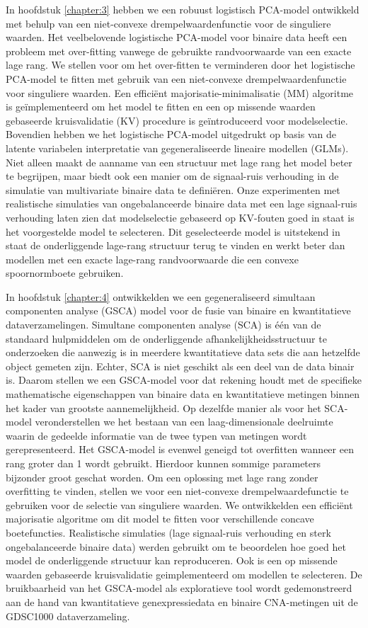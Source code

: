 In hoofdstuk \ref{chapter:3} hebben we een robuust logistisch PCA-model ontwikkeld met behulp van een niet-convexe drempelwaardenfunctie voor de singuliere waarden. Het veelbelovende logistische PCA-model voor binaire data heeft een probleem met over-fitting vanwege de gebruikte randvoorwaarde van een  exacte lage rang. We stellen voor om het over-fitten te verminderen door het logistische PCA-model te fitten met gebruik van een niet-convexe drempelwaardenfunctie voor singuliere waarden. Een efficiënt majorisatie-minimalisatie (MM) algoritme is geïmplementeerd om het model te fitten en een op missende waarden gebaseerde kruisvalidatie (KV) procedure is geïntroduceerd voor modelselectie. Bovendien hebben we het logistische PCA-model uitgedrukt op basis van de latente variabelen interpretatie van gegeneraliseerde lineaire modellen (GLMs). Niet alleen maakt de aanname van een structuur met lage rang het model beter te begrijpen, maar biedt ook een manier om de signaal-ruis verhouding in de simulatie van multivariate binaire data te definiëren. Onze experimenten met realistische simulaties van ongebalanceerde binaire data met een lage signaal-ruis verhouding laten zien dat modelselectie gebaseerd op KV-fouten goed in staat is het voorgestelde model te selecteren. Dit geselecteerde model is uitstekend in staat de onderliggende lage-rang structuur terug te vinden en werkt beter dan modellen met een exacte lage-rang randvoorwaarde die een convexe spoornormboete gebruiken.

In hoofdstuk \ref{chapter:4} ontwikkelden we een gegeneraliseerd simultaan componenten analyse (GSCA) model voor de fusie van binaire en kwantitatieve dataverzamelingen. Simultane componenten analyse (SCA) is \'e\'en van de standaard hulpmiddelen om de onderliggende afhankelijkheidsstructuur te onderzoeken die aanwezig is in meerdere kwantitatieve data sets die aan hetzelfde object gemeten zijn. Echter, SCA is niet geschikt als een deel van de data binair is. Daarom stellen we een GSCA-model voor dat rekening houdt met de specifieke mathematische eigenschappen van binaire data en kwantitatieve metingen binnen het kader van grootste aannemelijkheid. Op dezelfde manier als voor het SCA-model veronderstellen we het bestaan van een laag-dimensionale deelruimte waarin de gedeelde informatie van de twee typen van metingen wordt gerepresenteerd. Het GSCA-model is evenwel geneigd tot overfitten wanneer een rang groter dan 1 wordt gebruikt. Hierdoor kunnen sommige parameters bijzonder groot geschat worden. Om een oplossing met lage rang zonder overfitting te vinden, stellen we voor een niet-convexe drempelwaardefunctie te gebruiken voor de selectie van singuliere waarden. We ontwikkelden een effici\"ent majorisatie algoritme om dit model te fitten voor verschillende concave boetefuncties. Realistische simulaties (lage signaal-ruis verhouding en sterk ongebalanceerde binaire data) werden gebruikt om te beoordelen hoe goed het model de onderliggende structuur kan reproduceren. Ook is een op missende waarden gebaseerde kruisvalidatie geimplementeerd om modellen te selecteren. De bruikbaarheid van het GSCA-model als exploratieve tool wordt gedemonstreerd aan de hand van kwantitatieve genexpressiedata en binaire CNA-metingen uit de GDSC1000 dataverzameling.

